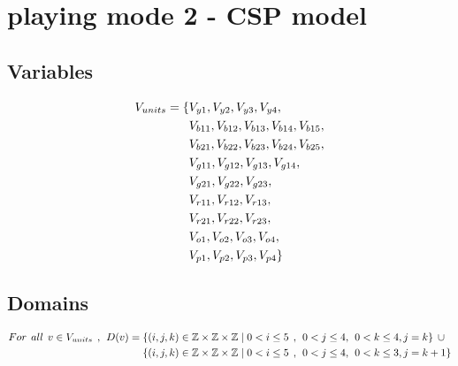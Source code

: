 \section{playing mode 2 - CSP model}
\subsection{Variables}
\begin{align*}
V_{units}=\{&V_{y1},V_{y2},V_{y3},V_{y4},\\&V_{b11},V_{b12},V_{b13},V_{b14},
V_{b15},\\&V_{b21},V_{b22},V_{b23},V_{b24},V_{b25},\\&V_{g11},V_{g12},V_{g13},V_{g14},\\&V_{g21},V_{g22},V_{g23},\\&V_{r11},
V_{r12},V_{r13},\\&V_{r21},V_{r22},V_{r23},\\&V_{o1},V_{o2},V_{o3},V_{o4},\\&V_{p1},V_{p2},V_{p3},V_{p4}\}
\end{align*}
\subsection{Domains}
\begin{align*}
For \hspace{1ex} all \hspace{1ex} v \in V_{units} \hspace{1ex},\hspace{1ex} D(v)=\{&(i,j,k) \in \mathbb{Z} \times \mathbb{Z}	\times \mathbb{Z} \mid  0<i \leq 5 \hspace{1ex} , \hspace{1ex} 0<j \leq 4,\hspace{1ex} 0<k \leq 4,j=k\} \hspace{1ex}\cup\\
\{&(i,j,k) \in \mathbb{Z} \times \mathbb{Z}	\times \mathbb{Z} \mid  0<i \leq 5 \hspace{1ex} , \hspace{1ex} 0<j \leq 4,\hspace{1ex} 0<k \leq 3,j=k+1\}
\end{align*}